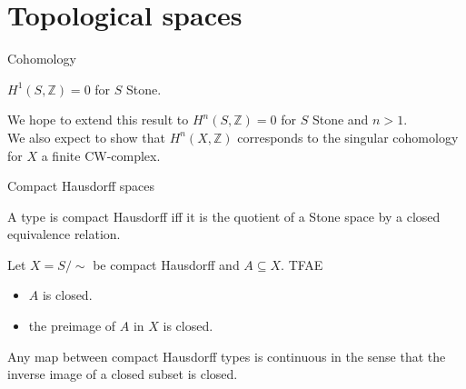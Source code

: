 \section{Topological spaces}
\begin{frame}{Cohomology}%
  \pause 
    \begin{lemma}
      $H^1(S,\mathbb Z) = 0$ for $S$ Stone.
    \end{lemma}
    \pause 
    We hope to extend this result to 
      $H^n(S,\mathbb Z) = 0$ for $S$ Stone and $n>1$.
      \pause
      \\
      We also expect to show that $H^n(X,\mathbb Z)$ corresponds to the singular cohomology 
      for $X$ a finite CW-complex.\\
\end{frame}
\begin{frame}{Compact Hausdorff spaces}
  \begin{definition}
    A type is compact Hausdorff iff it is the quotient of a 
    Stone space by a closed equivalence relation. 
  \end{definition}
  \pause
  \begin{lemma}
    Let $X = S / \sim $ be compact Hausdorff and $A\subseteq X$. TFAE
    \begin{itemize}
      \item $A$ is closed. 
      \item the preimage of $A$ in $X$ is closed. 
    \end{itemize}
\end{lemma}
\pause
  \begin{corollary}
    Any map between compact Hausdorff types is 
    continuous in the sense that the 
    inverse image of a closed subset is closed. 
  \end{corollary}
\end{frame}


